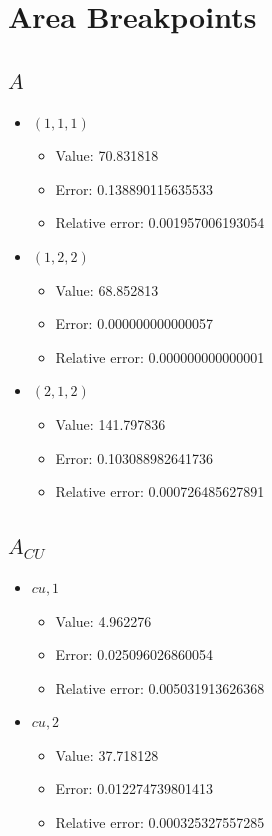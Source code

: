 \documentclass{article}%
\begin{document}
\section{Area Breakpoints}%
\thispagestyle{plain}%
\subsection{$A$}%
\begin{itemize}%
	\item $(1, 1, 1)$%
	\begin{itemize}%
		\item Value: 70.831818%
		\item Error: 0.138890115635533%
		\item Relative error: 0.001957006193054%
	\end{itemize}%
	\item $(1, 2, 2)$%
	\begin{itemize}%
		\item Value: 68.852813%
		\item Error: 0.000000000000057%
		\item Relative error: 0.000000000000001%
	\end{itemize}%
	\item $(2, 1, 2)$%
	\begin{itemize}%
		\item Value: 141.797836%
		\item Error: 0.103088982641736%
		\item Relative error: 0.000726485627891%
	\end{itemize}%
\end{itemize}%
\subsection{$A_{CU}$}%
\begin{itemize}%
	\item $\textit{cu},1$%
	\begin{itemize}%
		\item Value: 4.962276%
		\item Error: 0.025096026860054%
		\item Relative error: 0.005031913626368%
	\end{itemize}%
	\item $\textit{cu},2$%
	\begin{itemize}%
		\item Value: 37.718128%
		\item Error: 0.012274739801413%
		\item Relative error: 0.000325327557285%
	\end{itemize}%
\end{itemize}%
\end{document}
